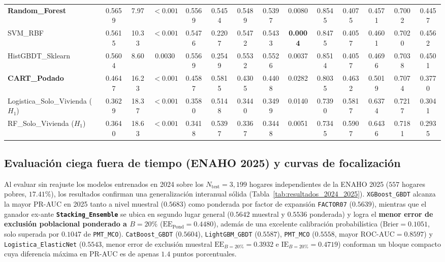 \begin{table}[!t]
\begin{tabular}{lccccccccccccc}
\textbf{Random\_Forest} & 0.5659 & 7.97 & $<0.001$ & 0.5569 & 0.5454 & 0.5489 & 0.5397 & 0.0080 & 0.8545 & 0.4075 & 0.4571 & 0.7002 & 0.4457 \\
SVM\_RBF & 0.5615 & 10.33 & $<0.001$ & 0.5476 & 0.2207 & 0.5472 & 0.5433 & \textbf{0.0004} & 0.8475 & 0.4057 & 0.4601 & 0.7020 & 0.4562 \\
HistGBDT\_Sklearn & 0.5604 & 8.60 & 0.0030 & 0.5569 & 0.2549 & 0.5532 & 0.5526 & 0.0037 & 0.8514 & 0.4057 & 0.4696 & 0.7038 & 0.4501 \\
\textbf{CART\_Podado} & 0.4647 & 16.23 & $<0.001$ & 0.4587 & 0.5815 & 0.4305 & 0.4408 & 0.0282 & 0.8035 & 0.4632 & 0.5019 & 0.7074 & 0.3770 \\
\addlinespace[1.5pt]
Logistica\_Solo\_Vivienda ($H_1$) & 0.3629 & 18.37 & $<0.001$ & 0.3580 & 0.5148 & 0.3440 & 0.3499 & 0.0140 & 0.7390 & 0.5817 & 0.6374 & 0.7217 & 0.3041 \\
RF\_Solo\_Vivienda ($H_1$) & 0.3640 & 18.63 & $<0.001$ & 0.3418 & 0.5397 & 0.3367 & 0.3448 & 0.0051 & 0.7345 & 0.5907 & 0.6436 & 0.7181 & 0.2935 \\
\bottomrule
\end{tabular}
\end{table}

\subsection{Evaluación ciega fuera de tiempo (ENAHO 2025) y curvas de focalización}

Al evaluar sin reajuste los modelos entrenados en 2024 sobre los $N_{\text{test}}=3{,}199$ hogares independientes de la ENAHO 2025 ($557$ hogares pobres, $17.41\%$), los resultados confirman una generalización interanual sólida (Tabla~\ref{tab:resultados_2024_2025}). \texttt{XGBoost\_GBDT} alcanza la mayor PR-AUC en 2025 tanto a nivel muestral ($0.5683$) como ponderada por factor de expansión \texttt{FACTOR07} ($0.5639$), mientras que el ganador ex-ante \textbf{\texttt{Stacking\_Ensemble}} se ubica en segundo lugar general ($0.5642$ muestral y $0.5536$ ponderada) y logra el \textbf{menor error de exclusión poblacional ponderado a $B=20\%$} ($\text{EE}_{\text{Pond}}=0.4480$), además de una excelente calibración probabilística ($\text{Brier}=0.1051$, solo superada por $0.1047$ de \texttt{PMT\_MCO}). \texttt{CatBoost\_GBDT} ($0.5604$), \texttt{LightGBM\_GBDT} ($0.5587$), \texttt{PMT\_MCO} ($0.5558$, mayor $\text{ROC-AUC}=0.8597$) y \texttt{Logistica\_ElasticNet} ($0.5543$, menor error de exclusión muestral $\text{EE}_{B=20\%}=0.3932$ e $\text{IE}_{B=20\%}=0.4719$) conforman un bloque compacto cuya diferencia máxima en PR-AUC es de apenas $1.4$ puntos porcentuales.

